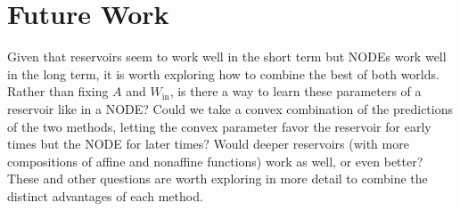 \documentclass[12pt,oneside]{article}
\theoremstyle{plain}
\newcommand{\Win}{W_{\text{in}}}%
\begin{document}
\section{Future Work}
Given that reservoirs seem to work well in the short term but NODEs work well in the long term, it is worth exploring how to combine the best of both worlds. Rather than fixing $A$ and $\Win$, is there a way to learn these parameters of a reservoir like in a NODE? Could we take a convex combination of the predictions of the two methods, letting the convex parameter favor the reservoir for early times but the NODE for later times? Would deeper reservoirs (with more compositions of affine and nonaffine functions) work as well, or even better? These and other questions are worth exploring in more detail to combine the distinct advantages of each method. 
\end{document}
